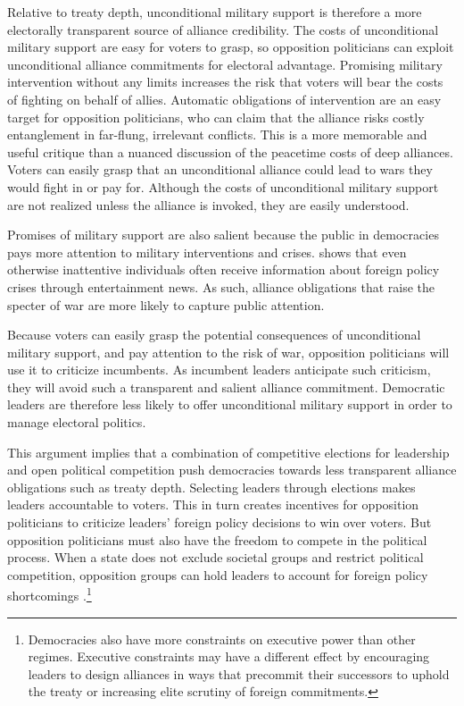 \documentclass[12pt]{article}
\begin{document}
Relative to treaty depth, unconditional military support is therefore a more electorally transparent source of alliance credibility. 
The costs of unconditional military support are easy for voters to grasp, so opposition politicians can exploit unconditional alliance commitments for electoral advantage. 
Promising military intervention without any limits increases the risk that voters will bear the costs of fighting on behalf of allies. 
Automatic obligations of intervention are an easy target for opposition politicians, who can claim that the alliance risks costly entanglement in far-flung, irrelevant conflicts.  
This is a more memorable and useful critique than a nuanced discussion of the peacetime costs of deep alliances. 
Voters can easily grasp that an unconditional alliance could lead to wars they would fight in or pay for. 
Although the costs of unconditional military support are not realized unless the alliance is invoked, they are easily understood. 


Promises of military support are also salient because the public in democracies pays more attention to military interventions and crises. 
\citet{Baum2002} shows that even otherwise inattentive individuals often receive information about foreign policy crises through entertainment news. 
As such, alliance obligations that raise the specter of war are more likely to capture public attention. 


Because voters can easily grasp the potential consequences of unconditional military support, and pay attention to the risk of war, opposition politicians will use it to criticize incumbents. 
As incumbent leaders anticipate such criticism, they will avoid such a transparent and salient alliance commitment.
Democratic leaders are therefore less likely to offer unconditional military support in order to manage electoral politics. 


This argument implies that a combination of competitive elections for leadership and open political competition push democracies towards less transparent alliance obligations such as treaty depth.
Selecting leaders through elections makes leaders accountable to voters. 
This in turn creates incentives for opposition politicians to criticize leaders' foreign policy decisions to win over voters. 
But opposition politicians must also have the freedom to compete in the political process.
When a state does not exclude societal groups and restrict political competition, opposition groups can hold leaders to account for foreign policy shortcomings \citep{PotterBaum2014}.\footnote{Democracies also have more constraints on executive power than other regimes. Executive constraints may have a different effect by encouraging leaders to design alliances in ways that precommit their successors to uphold the treaty or increasing elite scrutiny of foreign commitments.}
\end{document}

